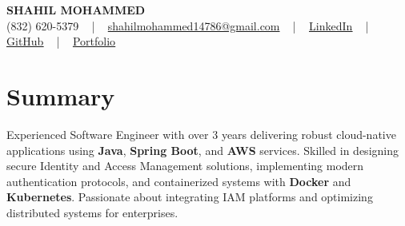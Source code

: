 \documentclass[letterpaper,10pt]{article}
\begin{document}
\begin{center}
    {\fontsize{14pt}{12pt}\selectfont \textbf{\MakeUppercase{Shahil Mohammed}}}\\ \vspace{2pt}
    \fontsize{10pt}{12pt}\selectfont (832) 620-5379 ~ | ~ \href{mailto:shahilmohammed14786@gmail.com}{shahilmohammed14786@gmail.com} ~ | ~  
    \href{https://www.linkedin.com/in/shahil-mohammed-9652931a1/}{\color{blue}\underline{LinkedIn}}  ~ | ~ 
    \href{https://github.com/freakbeast14}{\color{blue}\underline{GitHub}} ~ | ~ 
    \href{https://shahil-mohammed.netlify.app/}{\color{blue}\underline{Portfolio}}
    \vspace{-8pt}
\end{center}

\section{Summary}
\vspace{-2pt}\fontsize{8pt}{9pt}\selectfont
Experienced Software Engineer with over 3 years delivering robust cloud-native applications using \textbf{Java}, \textbf{Spring Boot}, and \textbf{AWS} services. Skilled in designing secure Identity and Access Management solutions, implementing modern authentication protocols, and containerized systems with \textbf{Docker} and \textbf{Kubernetes}. Passionate about integrating IAM platforms and optimizing distributed systems for enterprises.
 \vspace{-5pt}
 
\vspace{-2pt}
\end{document}
